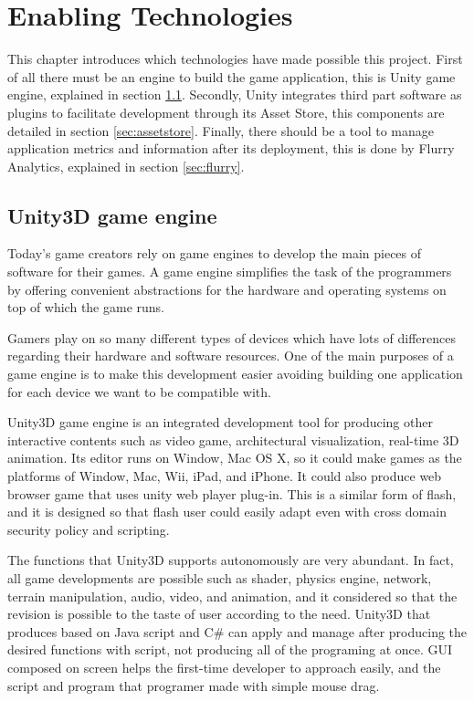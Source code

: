 
\chapter{Enabling Technologies}
\label{chap:enabling_technologies}
\begin{chapterintro}
This chapter introduces which technologies have made possible this project. First of all there must be an engine to build the game application, this is Unity game engine, explained in section \ref{sec:unity}. Secondly, Unity integrates third part software as plugins to facilitate development through its Asset Store, this components are detailed in section \ref{sec:assetstore}. Finally, there should be a tool to manage application metrics and information after its deployment, this is done by Flurry Analytics, explained in section \ref{sec:flurry}.
\end{chapterintro}

\cleardoublepage
\section{Unity3D game engine}
\label{sec:unity}
Today’s game creators rely on game engines to develop the main pieces of software for their games. A game engine simplifies the task of the programmers by offering convenient abstractions for the hardware and operating systems on top of which the game runs.~\cite{messaoudi2015dis}

Gamers play on so many different types of devices which have lots of differences regarding their hardware and software resources. One of the main purposes of a game engine is to make this development easier avoiding building one application for each device we want to be compatible with.

Unity3D game engine is an integrated development tool for producing other interactive contents such as video game, architectural visualization, real-time 3D animation. Its editor runs on Window, Mac OS X, so it could make games as the platforms of Window, Mac, Wii, iPad, and iPhone. It could also produce web browser game that uses unity web player plug-in. This is a similar form of flash, and it is designed so that flash user could easily adapt even with cross domain security policy and scripting.

The functions that Unity3D supports autonomously are very abundant. In fact, all game developments are possible such as shader, physics engine, network, terrain manipulation, audio, video, and animation, and it considered so that the revision is possible to the taste of user according to the need. Unity3D that produces based on Java script and C\# can apply and manage after producing the desired functions with script, not producing all of the programing at once. GUI composed on screen helps the first-time developer to approach easily, and the script and program that programer made with simple mouse drag.~\cite{kim2014dev}

